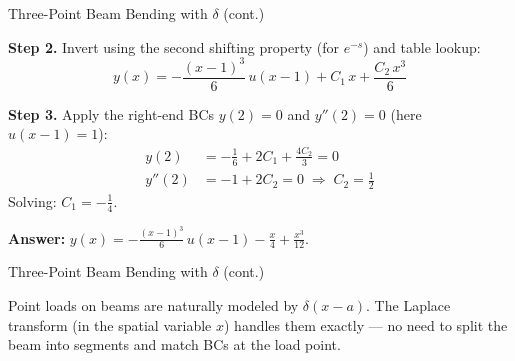 \documentclass[aspectratio=169,11pt]{beamer}
\begin{document}
\begin{frame}{Three-Point Beam Bending with $\delta$ (cont.)}
\footnotesize
\begin{examplebox}
\textbf{Step 2.} Invert using the second shifting property (for $e^{-s}$) and table lookup:
\[y(x) = -\frac{(x-1)^3}{6}\, u(x-1) + C_1\, x + \frac{C_2\, x^3}{6}\]

\textbf{Step 3.} Apply the right-end BCs $y(2) = 0$ and $y''(2) = 0$ (here $u(x-1) = 1$):
\begin{align*}
y(2) &= -\tfrac{1}{6} + 2C_1 + \tfrac{4C_2}{3} = 0 \\
y''(2) &= -1 + 2C_2 = 0 \;\Rightarrow\; C_2 = \tfrac{1}{2}
\end{align*}
Solving: $C_1 = -\tfrac{1}{4}$.

\textbf{Answer:} $y(x) = -\frac{(x-1)^3}{6}\, u(x-1) - \frac{x}{4} + \frac{x^3}{12}$.
\end{examplebox}
\end{frame}

\begin{frame}{Three-Point Beam Bending with $\delta$ (cont.)}
\footnotesize
\centering
{}
\vspace{1mm}
\begin{conceptbox}
Point loads on beams are naturally modeled by $\delta(x-a)$. The Laplace transform (in the spatial variable $x$) handles them exactly --- no need to split the beam into segments and match BCs at the load point.
\end{conceptbox}
\end{frame}
\end{document}
